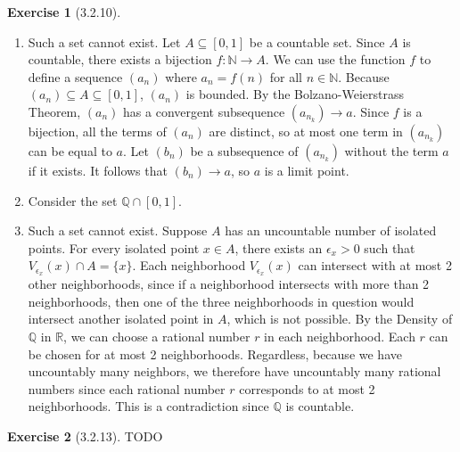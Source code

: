 \documentclass{amsart}
\theoremstyle{definition}
\newtheorem{exercise}{Exercise}
\newcommand{\N}{\mathbb{N}}
\newcommand{\Q}{\mathbb{Q}}
\newcommand{\R}{\mathbb{R}}
\begin{document}
\begin{exercise}[3.2.10]
  \begin{enumerate}[label={(\roman*)}]
    \item Such a set cannot exist. Let $A \subseteq [0, 1]$ be a countable set.
      Since $A$ is countable, there exists a bijection $f : \N \to A$. We can
      use the function $f$ to define a sequence $(a_n)$ where $a_n = f(n)$ for
      all $n \in \N$. Because $(a_n) \subseteq A \subseteq [0, 1]$, $(a_n)$ is
      bounded. By the Bolzano-Weierstrass Theorem, $(a_n)$ has a convergent
      subsequence $(a_{n_k}) \to a$. Since $f$ is a bijection, all the terms of
      $(a_n)$ are distinct, so at most one term in $(a_{n_k})$ can be equal to
      $a$. Let $(b_n)$ be a subsequence of $(a_{n_k})$ without the term $a$ if
      it exists. It follows that $(b_n) \to a$, so $a$ is a limit point.
    \item Consider the set $\Q \cap [0, 1]$.
    \item Such a set cannot exist. Suppose $A$ has an uncountable number of
      isolated points. For every isolated point $x \in A$, there exists
      an $\epsilon_x > 0$ such that $V_{\epsilon_x}(x) \cap A = \{x\}$. Each
      neighborhood $V_{\epsilon_x}(x)$ can intersect with at most 2 other
      neighborhoods, since if a neighborhood intersects with more than 2
      neighborhoods, then one of the three neighborhoods in question  would
      intersect another isolated point in $A$, which is not possible. By the
      Density of $\Q$ in $\R$, we can choose a rational number $r$ in each
      neighborhood. Each $r$ can be chosen for at most 2 neighborhoods.
      Regardless, because we have uncountably many neighbors, we therefore have
      uncountably many rational numbers since each rational number $r$
      corresponds to at most 2 neighborhoods. This is a contradiction since $\Q$
      is countable.
  \end{enumerate}
\end{exercise}

\begin{exercise}[3.2.13]
  TODO
\end{exercise}
\end{document}
